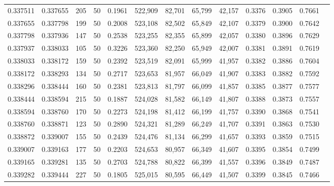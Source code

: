 \begin{tabular}{rrrrrrrrrrrrr}
0.337511 & 0.337655 &   205 &  50 &                                     0.1961 & 522,909 &  82,701 &  65,799 &  42,157 & 0.3376 & 0.3905 & 0.7661 \\
0.337655 & 0.337798 &   199 &  50 &                                     0.2008 & 523,108 &  82,502 &  65,849 &  42,107 & 0.3379 & 0.3900 & 0.7642 \\
0.337798 & 0.337936 &   147 &  50 &                                     0.2538 & 523,255 &  82,355 &  65,899 &  42,057 & 0.3380 & 0.3896 & 0.7629 \\
0.337937 & 0.338033 &   105 &  50 &                                     0.3226 & 523,360 &  82,250 &  65,949 &  42,007 & 0.3381 & 0.3891 & 0.7619 \\
0.338033 & 0.338172 &   159 &  50 &                                     0.2392 & 523,519 &  82,091 &  65,999 &  41,957 & 0.3382 & 0.3886 & 0.7604 \\
0.338172 & 0.338293 &   134 &  50 &                                     0.2717 & 523,653 &  81,957 &  66,049 &  41,907 & 0.3383 & 0.3882 & 0.7592 \\
0.338296 & 0.338444 &   160 &  50 &                                     0.2381 & 523,813 &  81,797 &  66,099 &  41,857 & 0.3385 & 0.3877 & 0.7577 \\
0.338444 & 0.338594 &   215 &  50 &                                     0.1887 & 524,028 &  81,582 &  66,149 &  41,807 & 0.3388 & 0.3873 & 0.7557 \\
0.338594 & 0.338760 &   170 &  50 &                                     0.2273 & 524,198 &  81,412 &  66,199 &  41,757 & 0.3390 & 0.3868 & 0.7541 \\
0.338760 & 0.338871 &   123 &  50 &                                     0.2890 & 524,321 &  81,289 &  66,249 &  41,707 & 0.3391 & 0.3863 & 0.7530 \\
0.338872 & 0.339007 &   155 &  50 &                                     0.2439 & 524,476 &  81,134 &  66,299 &  41,657 & 0.3393 & 0.3859 & 0.7515 \\
0.339007 & 0.339163 &   177 &  50 &                                     0.2203 & 524,653 &  80,957 &  66,349 &  41,607 & 0.3395 & 0.3854 & 0.7499 \\
0.339165 & 0.339281 &   135 &  50 &                                     0.2703 & 524,788 &  80,822 &  66,399 &  41,557 & 0.3396 & 0.3849 & 0.7487 \\
0.339282 & 0.339444 &   227 &  50 &                                     0.1805 & 525,015 &  80,595 &  66,449 &  41,507 & 0.3399 & 0.3845 & 0.7466 \\

\end{tabular}
